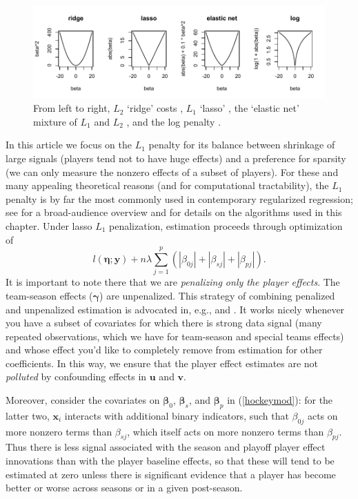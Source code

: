 \begin{figure}[t]
\includegraphics[width=\textwidth]{figures/penalties}
\caption{\label{costs} 
From left to right, 
$L_2$ `ridge' costs \cite{hoerl_ridge_1970}, $L_1$ `lasso' \cite{tibshirani_regression_1996}, the `elastic net' mixture of $L_1$ and $L_2$ \cite{zou_regularization_2005}, and the log penalty \cite{candes_enhancing_2008}.
}
\end{figure}

In this article we focus on the $L_1$ penalty for its balance between
shrinkage of large signals (players tend not to have huge effects) and a
preference for sparsity (we can only measure the nonzero effects of a subset
of players).  For these and many appealing theoretical reasons (and for
computational tractability), the $L_1$ penalty is by far the most commonly
used in contemporary regularized regression; see
\cite{hastie:tibsh:fried:2001} for a broad-audience overview and
\cite{taddy_one-step_2015} for details on the algorithms used in this chapter.
Under lasso $L_1$ penalization, estimation proceeds through optimization of
\begin{equation} \label{pendev}
l\left(\boldsymbol{\eta}; \mathbf{y}\right) + n\lambda \sum_{j=1}^p\left(|\beta_{0j}| + |\beta_{sj}| + |\beta_{pj}|\right).
\end{equation}
It is important to note there that we are \textit{penalizing only the player
effects}.  The team-season effects ($\boldsymbol{\gamma}$) are unpenalized.
This strategy of combining penalized and unpenalized estimation is advocated
in, e.g.,
\cite{taddy_distributed_2015} and \cite{gentzkow_measuring_2015}.  It works
nicely whenever you have a subset of covariates for which there is strong data
signal (many repeated observations, which we have for team-season and special
teams effects) and whose effect you'd like to completely remove from
estimation for other coefficients.  In this way, we ensure that the player
effect estimates are not \textit{polluted} by confounding effects in
$\mathbf{u}$ and $\mathbf{v}$.  

Moreover, consider the covariates on $\boldsymbol{\beta}_0$,
$\boldsymbol{\beta}_s$, and $\boldsymbol{\beta}_p$ in (\ref{hockeymod}): for the latter two,
 $\mathbf{x}_i$ interacts with additional binary indicators, such that
$\beta_{0j}$ acts on more nonzero terms than $\beta_{sj}$, which itself acts
on more nonzero terms than $\beta_{pj}$.  Thus there is  less signal
associated with the season and playoff player effect innovations than with the
player baseline effects, so that these will tend to be estimated at zero unless
there is significant evidence that a player has become better or worse across
seasons or in a given post-season.

